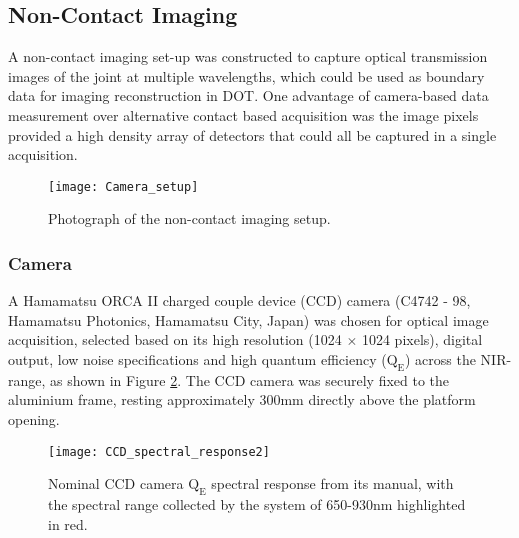 \documentclass[twoside]{bhamthesis}
\theoremstyle{definition}
\begin{document}

\subsection{Non-Contact Imaging}

A non-contact imaging set-up was constructed to capture optical transmission images of the joint at multiple wavelengths, which could be used as boundary data for imaging reconstruction in DOT. One advantage of camera-based data measurement over alternative contact based acquisition was the image pixels provided a high density array of detectors that could all be captured in a single acquisition.

\begin{figure}[!ht]
\centering
  \centering
  \texttt{[image: Camera\_setup]}
	\caption{Photograph of the non-contact imaging setup.}
  \label{fig:Camera_setup}
\end{figure}

\subsubsection{Camera}

A Hamamatsu ORCA II charged couple device (CCD) camera (C4742 - 98, Hamamatsu Photonics, Hamamatsu City, Japan) was chosen for optical image acquisition, selected based on its high resolution (1024 $\times$ 1024 pixels), digital output, low noise specifications and high quantum efficiency ($\mathrm{Q_E}$) across the NIR-range, as shown in Figure \ref{fig:CCD_spectral_response}. The CCD camera was securely fixed to the aluminium frame, resting approximately 300mm directly above the platform opening.

\begin{figure}[!ht]
\centering
  \centering
  \texttt{[image: CCD\_spectral\_response2]}
	\caption{Nominal CCD camera $\mathrm{Q_E}$ spectral response from its manual, with the spectral range collected by the system of 650-930nm highlighted in red.}
  \label{fig:CCD_spectral_response}
\end{figure}
 
\end{document}
